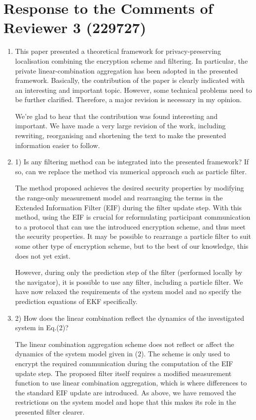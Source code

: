 \documentclass[a4paper]{scrartcl}
\newenvironment{rebuttal}{\begin{enumerate}[label={\color{grey}\thesection.\arabic{enumi}},leftmargin=0pt,ref=\thesection.\arabic{enumi}]}{\end{enumerate}}
\newcommand{\reviewtext}[1]{{\color{nblue} #1}}
\begin{document}
\section*{Response to the Comments of Reviewer 3 (229727)}
\def\thesection{R3}
\begin{rebuttal}
\item \reviewtext{This paper presented a theoretical framework for privacy-preserving localisation combining the encryption scheme and filtering. In particular, the private linear-combination aggregation has been adopted in the presented framework. Basically, the contribution of the paper is clearly indicated with an interesting and important topic. However, some technical problems need to be further clarified. Therefore, a major revision is necessary in my opinion.}

We're glad to hear that the contribution was found interesting and important. We have made a very large revision of the work, including rewriting, reorganising and shortening the text to make the presented information easier to follow.

\item \reviewtext{1) Is any filtering method can be integrated into the presented framework? If so, can we replace the method via numerical approach such as particle filter.}

The method proposed achieves the desired security properties by modifying the range-only measurement model and rearranging the terms in the Extended Information Filter (EIF) during the filter update step. With this method, using the EIF is crucial for reformulating participant communication to a protocol that can use the introduced encryption scheme, and thus meet the security properties. It may be possible to rearrange a particle filter to suit some other type of encryption scheme, but to the best of our knowledge, this does not yet exist.

However, during only the prediction step of the filter (performed locally by the navigator), it is possible to use any filter, including a particle filter. We have now relaxed the requirements of the system model and no specify the prediction equations of EKF specifically.

\item \reviewtext{2) How does the linear combination reflect the dynamics of the investigated system in Eq.(2)?}

The linear combination aggregation scheme does not reflect or affect the dynamics of the system model given in ($2$). The scheme is only used to encrypt the required communication during the computation of the EIF update step. The proposed filter itself requires a modified measurement function to use linear combination aggregation, which is where differences to the standard EIF update are introduced. As above, we have removed the restrictions on the system model and hope that this makes its role in the presented filter clearer.


\end{rebuttal}
\end{document}
